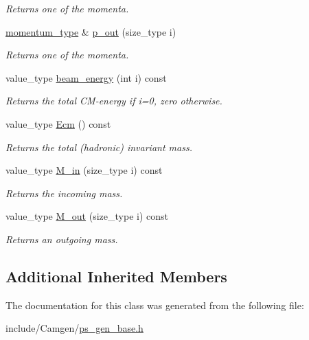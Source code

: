 \begin{DoxyCompactItemize}
\begin{DoxyCompactList}\small\item\em Returns one of the momenta. \end{DoxyCompactList}\item 
\hypertarget{a00376_a830416e6a878fe76fd7653fd23ef21dc}{}\hyperlink{a00579}{momentum\+\_\+type} \& \hyperlink{a00376_a830416e6a878fe76fd7653fd23ef21dc}{p\+\_\+out} (size\+\_\+type i)\label{a00376_a830416e6a878fe76fd7653fd23ef21dc}

\begin{DoxyCompactList}\small\item\em Returns one of the momenta. \end{DoxyCompactList}\item 
\hypertarget{a00376_a8d45247bb59c6dc1be7b04270f310bae}{}value\+\_\+type \hyperlink{a00376_a8d45247bb59c6dc1be7b04270f310bae}{beam\+\_\+energy} (int i) const \label{a00376_a8d45247bb59c6dc1be7b04270f310bae}

\begin{DoxyCompactList}\small\item\em Returns the total C\+M-\/energy if i=0, zero otherwise. \end{DoxyCompactList}\item 
\hypertarget{a00376_a66e408db6170c531c7e1a5b80bdd8ee4}{}value\+\_\+type \hyperlink{a00376_a66e408db6170c531c7e1a5b80bdd8ee4}{Ecm} () const \label{a00376_a66e408db6170c531c7e1a5b80bdd8ee4}

\begin{DoxyCompactList}\small\item\em Returns the total (hadronic) invariant mass. \end{DoxyCompactList}\item 
\hypertarget{a00376_a9233243ceef0b960d8c412da9d025560}{}value\+\_\+type \hyperlink{a00376_a9233243ceef0b960d8c412da9d025560}{M\+\_\+in} (size\+\_\+type i) const \label{a00376_a9233243ceef0b960d8c412da9d025560}

\begin{DoxyCompactList}\small\item\em Returns the incoming mass. \end{DoxyCompactList}\item 
\hypertarget{a00376_aaf650e881d8c4b4886931ba974d2abc3}{}value\+\_\+type \hyperlink{a00376_aaf650e881d8c4b4886931ba974d2abc3}{M\+\_\+out} (size\+\_\+type i) const \label{a00376_aaf650e881d8c4b4886931ba974d2abc3}

\begin{DoxyCompactList}\small\item\em Returns an outgoing mass. \end{DoxyCompactList}\end{DoxyCompactItemize}
\subsection*{Additional Inherited Members}


The documentation for this class was generated from the following file\+:\begin{DoxyCompactItemize}
\item 
include/\+Camgen/\hyperlink{a00743}{ps\+\_\+gen\+\_\+base.\+h}\end{DoxyCompactItemize}
